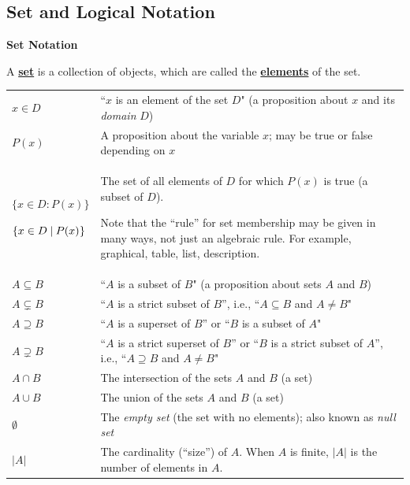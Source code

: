 \documentclass[11pt]{article}
\newcommand\st{:}
\renewcommand\emph[1]{\underline{\bf{#1}}} %
\theoremstyle{definition}
\begin{document}
\subsection{Set and Logical Notation}



{\bf Set Notation}

 A \emph{set} is a collection of objects, which are called the \emph{elements} of the set.


\vspace*{8pt}
\begin{tabular}{L{1in}L{5in}}
$x\in D$ & ``$x$ is an element of the set $D$"  (a proposition about $x$ and its {\it domain} $D$)\\

$P(x)$ & A proposition about the variable $x$; may be true or false depending on $x$ \\

$\{x \in D\st P(x)\}$ 

$\{x\in D \hspace*{2.5pt}|\hspace*{2.5pt} P(x)\hspace*{.25pt}\}$ & The set of all elements of $D$ for which $P(x)$ is true (a subset of $D$). 

Note that the ``rule'' for set membership may be given in many ways, not just an algebraic rule. For example, graphical, table, list, description.\\ 

$A \subseteq B$ & ``$A$ is a subset of $B$"  (a proposition about sets $A$ and $B$)\\

$A \subsetneq B$ & ``$A$ is a strict subset of $B$'', i.e., ``$A\subseteq B$ and $A \neq B$" \\
$A \supseteq B$ & ``$A$ is a superset of $B$'' or ``$B$ is a subset of $A$" \\

$A \supsetneq B$ &  ``$A$ is a strict superset of $B$'' or ``$B$ is a strict subset of $A$'',  i.e., ``$A\supseteq B$ and $A \neq B$"   \\ 


$A \cap B$ & The intersection of the sets $A$ and $B$  (a set)\\

$A \cup B$ & The union of the sets $A$ and $B$  (a set)\\

$\emptyset$ & The {\it empty set} (the set with no elements); also known as {\it null set}\\
$|A|$ & The cardinality (``size'') of $A$. When $A$ is finite, $|A|$ is the number of elements in $A$.
\end{tabular}
\end{document}
